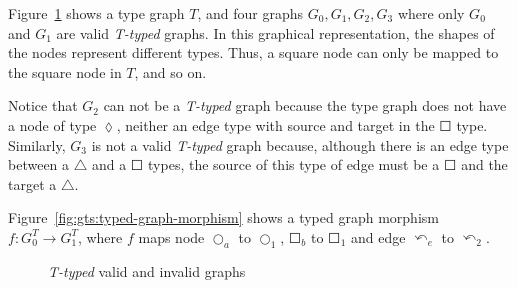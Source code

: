 \begin{example} Figure~\ref{fig:gts:typed-graphs} shows a type graph $T$, and four graphs $G_0, G_1, G_2, G_3$ where only $G_0$ and $G_1$ are valid \emph{T-typed} graphs. In this graphical representation, the shapes of the nodes represent different types. Thus, a square node can only be mapped to the square node in $T$, and so on.
  
  Notice that $G_2$ can not be a \emph{T-typed} graph because the type graph does not have a node of type $\lozenge$, neither an edge type with source and target in the $\Square$ type. Similarly, $G_3$ is not a valid \emph{T-typed} graph because, although there is an edge type between a $\triangle$ and a $\Square$ types, the source of this type of edge must be a $\Square$ and the target a $\triangle$.

  Figure~\ref{fig:gts:typed-graph-morphism} shows a typed graph morphism $f : G_0^T \rightarrow G_1^T$, where $f$ maps node $\Circle_a$ to $\Circle_1$, $\Square_b$ to $\Square_1$ and edge $\curvearrowleft_e$ to $\curvearrowleft_2$.
\begin{figure}[!ht]
  \centering
  \caption{\emph{T-typed} valid and invalid graphs}\label{fig:gts:typed-graphs}
\end{figure}


\end{example}

